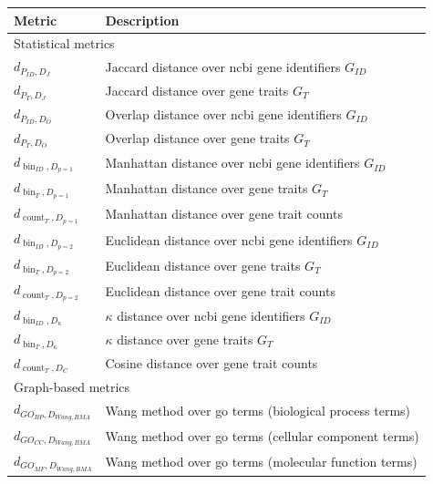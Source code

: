\documentclass{thesisclass}
\DeclareMathOperator{\bin}{bin}
\DeclareMathOperator{\countOp}{count}
\begin{document}
\begin{table}[!ht]
	\centering
	\begin{tabularx}{\linewidth}{l|X}
		\hline
		Metric & Description \\
		\hline
		\multicolumn{2}{l}{Statistical metrics} \\
		\hline
		$\displaystyle d_{P_{ID}, D_J}$ & Jaccard distance over \acrshort{ncbi} gene identifiers $G_{ID}$\\
		$\displaystyle d_{P_{T}, D_J}$ & Jaccard distance over gene traits $G_T$ \\
		$\displaystyle d_{P_{ID}, D_O}$ & Overlap distance over \acrshort{ncbi} gene identifiers $G_{ID}$\\
		$\displaystyle d_{P_{T}, D_O}$ & Overlap distance over gene traits $G_T$ \\
		\hline
	    $\displaystyle d_{\bin_{ID}, D_{p=1}}$ & Manhattan distance over \acrshort{ncbi} gene identifiers $G_{ID}$ \\
	    $\displaystyle d_{\bin_{T}, D_{p=1}}$ & Manhattan distance over gene traits $G_T$ \\
		$\displaystyle d_{\countOp_{T}, D_{p=1}}$ & Manhattan distance over gene trait counts \\
		$\displaystyle d_{\bin_{ID}, D_{p=2}}$ & Euclidean distance over \acrshort{ncbi} gene identifiers  $G_{ID}$\\
		$\displaystyle d_{\bin_{T}, D_{p=2}}$ & Euclidean distance over gene traits $G_T$ \\
		$\displaystyle d_{\countOp_{T}, D_{p=2}}$ & Euclidean distance over gene trait counts \\
		$\displaystyle d_{\bin_{ID}, D_\kappa}$ & $\kappa$ distance over \acrshort{ncbi} gene identifiers $G_{ID}$\\
		$\displaystyle d_{\bin_{T}, D_\kappa}$ & $\kappa$ distance over gene traits $G_T$ \\
		$\displaystyle d_{\countOp_{T}, D_C}$ & Cosine distance over gene trait counts \\
		\hline
		\multicolumn{2}{l}{Graph-based metrics} \\
		\hline
		$\displaystyle d_{GO_{BP}, D_{Wang,BMA}}$ & Wang method over \acrshort{go} terms (biological process terms) \\
		$\displaystyle d_{GO_{CC}, D_{Wang,BMA}}$ & Wang method over \acrshort{go} terms (cellular component terms) \\
		$\displaystyle d_{GO_{MF}, D_{Wang,BMA}}$ & Wang method over \acrshort{go} terms (molecular function terms) \\

\end{tabularx}
\end{table}
\end{document}
